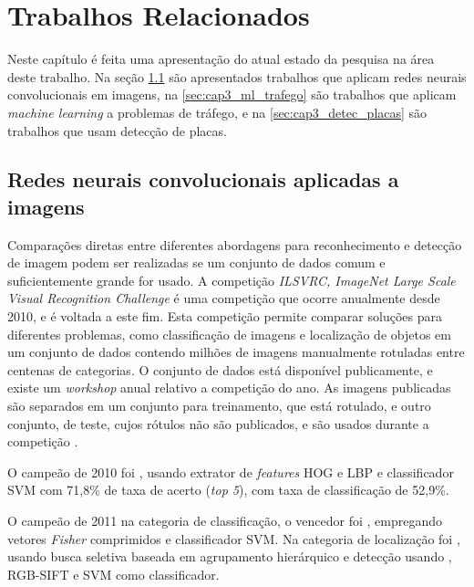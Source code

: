
\chapter{Trabalhos Relacionados}

Neste capítulo é feita uma apresentação do atual estado da pesquisa na área
deste trabalho. Na seção \ref{sec:cap3_img} são apresentados trabalhos que
aplicam redes neurais convolucionais em imagens, na \ref{sec:cap3_ml_trafego} 
são trabalhos que aplicam \emph{machine learning} a problemas de tráfego, e na
\ref{sec:cap3_detec_placas} são trabalhos que usam detecção de placas.

\section{Redes neurais convolucionais aplicadas a imagens} \label{sec:cap3_img}

Comparações diretas entre diferentes abordagens para reconhecimento e detecção de
imagem podem ser realizadas se um conjunto de dados comum e suficientemente
grande for usado. A competição \emph{ILSVRC, ImageNet Large Scale Visual
Recognition Challenge} é uma competição que ocorre anualmente desde 2010, e é
voltada a este fim. Esta competição permite comparar soluções 
para diferentes problemas, como classificação de imagens e localização de
objetos em um conjunto de
dados contendo milhões de imagens manualmente rotuladas entre centenas de
categorias. O conjunto de dados está disponível publicamente, e existe um
\emph{workshop} anual relativo a competição do ano. As imagens publicadas são
separados em um conjunto para treinamento, que está rotulado, e outro
conjunto, de
teste, cujos rótulos não são publicados, e são usados durante a competição
 \cite{ILSVRC15}.

O campeão de 2010 foi , usando extrator de
\emph{features} HOG e LBP e classificador SVM com 71,8\% de taxa de
acerto (\emph{top 5}), com taxa de classificação de 52,9\%.

O campeão de 2011 na categoria de classificação, o vencedor foi
, empregando vetores
\emph{Fisher} comprimidos e classificador SVM. Na categoria de localização foi
, usando busca seletiva baseada em agrupamento
hierárquico e detecção usando , RGB-SIFT e SVM como classificador.

